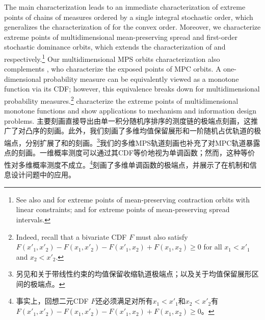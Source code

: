\documentclass[12pt,letterpaper]{article}
\newenvironment{original}{\color{black}}{}
\newenvironment{translation}{\color{blue}}{}
\theoremstyle{plain}
\theoremstyle{definition}
\theoremstyle{remark}
\theoremstyle{definition}
\begin{document}
\begin{original}
The main characterization leads to an immediate characterization of extreme points of chains of measures ordered by a single integral stochastic order, which generalizes the characterization of \citet{Ciosmak2023} for the convex order. Moreover, we characterize extreme points of multidimensional mean-preserving spread and first-order stochastic dominance orbits, which extends the characterization of \citet*{kleiner2021extreme} and \citet{yang2024monotone} respectively.\footnote{See also \citet{nikzad2023constrained} and \citet{candogan2021optimal} for extreme points of mean-preserving contraction orbits with linear constraints; and \citet{augias2025economicsconvexfunctionintervals} for extreme points of mean-preserving spread intervals.} Our multidimensional MPS orbits characterization also complements \citet{kleiner2024extreme}, who characterize the exposed points of MPC orbits. A one-dimensional probability measure can be equivalently viewed as a monotone function via its CDF; however, this equivalence breaks down for multidimensional probability measures.\footnote{Indeed, recall that a bivariate CDF $F$ must also satisfy $F(x'_1,x'_2) - F(x_1,x'_2) - F(x'_1,x_2) + F(x_1,x_2) \ge 0$ for all $x_1 < x'_1$ and $x_2 < x'_2$.} \citet{yang2025multidimensional} characterize the extreme points of multidimensional monotone functions and show applications to mechanism and information design problems.
\end{original}
\begin{translation}
主要刻画直接导出由单一积分随机序排序的测度链的极端点刻画，这推广了\citet{Ciosmak2023}对凸序的刻画。此外，我们刻画了多维均值保留展形和一阶随机占优轨道的极端点，分别扩展了\citet*{kleiner2021extreme}和\citet{yang2024monotone}的刻画。\footnote{另见\citet{nikzad2023constrained}和\citet{candogan2021optimal}关于带线性约束的均值保留收缩轨道极端点；以及\citet{augias2025economicsconvexfunctionintervals}关于均值保留展形区间的极端点。}我们的多维MPS轨道刻画也补充了\citet{kleiner2024extreme}对MPC轨道暴露点的刻画。一维概率测度可以通过其CDF等价地视为单调函数；然而，这种等价性对多维概率测度不成立。\footnote{事实上，回想二元CDF $F$还必须满足对所有$x_1 < x'_1$和$x_2 < x'_2$有$F(x'_1,x'_2) - F(x_1,x'_2) - F(x'_1,x_2) + F(x_1,x_2) \ge 0$。}\citet{yang2025multidimensional}刻画了多维单调函数的极端点，并展示了在机制和信息设计问题中的应用。
\end{translation}
\end{document}
